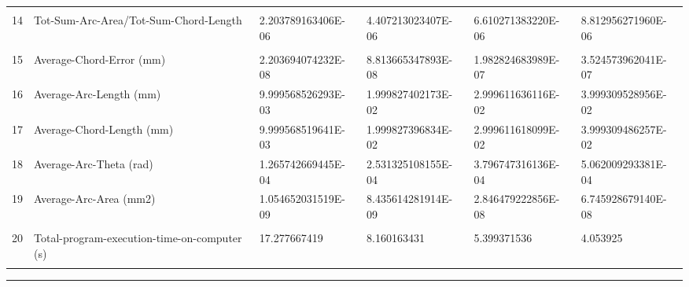 \begin{landscape}
\begin{table}[ht]
{\begin{tabular}{ p{0.4cm} p{8.3cm} p{4.00cm} p{4.0cm} p{4.00cm} p{4.0cm}}
&		&		&		&		&		\\
14	&	Tot-Sum-Arc-Area/Tot-Sum-Chord-Length	        &	2.203789163406E-06	&	4.407213023407E-06	&	6.610271383220E-06	&	8.812956271960E-06	\\
&		&		&		&		&		\\
15	&	Average-Chord-Error (mm)               	        &	2.203694074232E-08	&	8.813665347893E-08	&	1.982824683989E-07	&	3.524573962041E-07	\\
16	&	Average-Arc-Length (mm)               	        &	9.999568526293E-03	&	1.999827402173E-02	&	2.999611636116E-02	&	3.999309528956E-02	\\
17	&	Average-Chord-Length (mm)	                    &	9.999568519641E-03	&	1.999827396834E-02	&	2.999611618099E-02	&	3.999309486257E-02	\\
18	&	Average-Arc-Theta (rad)	                        &	1.265742669445E-04	&	2.531325108155E-04	&	3.796747316136E-04	&	5.062009293381E-04	\\
19	&	Average-Arc-Area (mm2)               	        &	1.054652031519E-09	&	8.435614281914E-09	&	2.846479222856E-08	&	6.745928679140E-08	\\
&		&		&		&		&		\\
20	&	Total-program-execution-time-on-computer (s) 	&	17.277667419	    &	8.160163431	        &	5.399371536	        &	4.053925	\\
&		&		&		&		&		

\end{tabular}
			
			
}   %
\hrule
\end{table}
\end{landscape}


